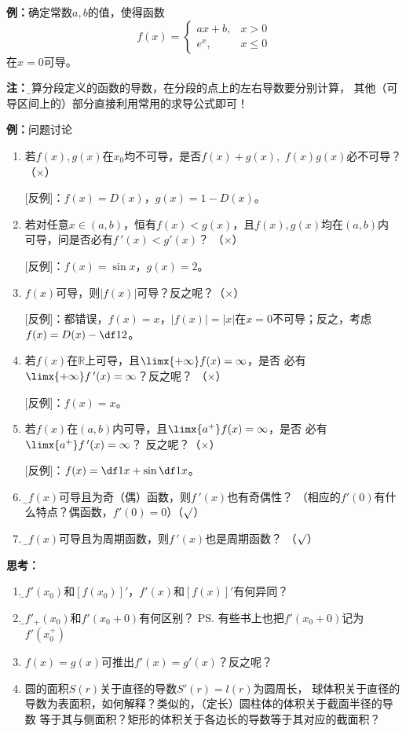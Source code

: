 {\bf 例：}确定常数$a,b$的值，使得函数
$$f(x)=\left\{\begin{array}{ll}ax+b,& x>0\\
e^x,& x\leq 0\end{array}\right.$$
在$x=0$可导。

{\bf 注：}{\b 计算分段定义的函数的导数，在分段的点上的左右导数要分别计算，
其他（可导区间上的）部分直接利用常用的求导公式即可！}

{\bf 例：}问题讨论
\begin{enumerate}[(1)]
  \setlength{\itemindent}{1cm}
  \item 若$f(x),g(x)$在$x_0$均不可导，是否$f(x)+g(x),$ $f(x)g(x)$必不可导？
  （{$\times$}） 
  
  [反例]：$f(x)=D(x)$，$g(x)=1-D(x)$。
  \item 若对任意$x\in (a,b)$，恒有$f(x)<g(x)$，且$f(x),g(x)$均在$(a,b)$内
  可导，问是否必有$f\,'(x)<g'(x)$？ （{$\times$}）
  
  [反例]：$f(x)=\sin x$，$g(x)=2$。 
  \item $f(x)$可导，则$|f(x)|$可导？反之呢？（{$\times$}）
  
  [反例]：都错误，$f(x)=x$，$|f(x)|=|x|$在$x=0$不可导；反之，考虑$f(x)=D(x)-\df12$。
  \item 若$f(x)$在$\mathbb{R}$上可导，且$\limx{+\infty}f(x)=\infty$，是否
  必有$\limx{+\infty}f\,'(x)=\infty$？反之呢？ （{$\times$}）
  
  [反例]：$f(x)=x$。
  \item 若$f(x)$在$(a,b)$内可导，且$\limx{a^+}f(x)=\infty$，是否
  必有$\limx{a^+}f\,'(x)=\infty$？ 反之呢？（{$\times$}）
  
  [反例]：$f(x)=\df1x+\sin\df1x$。 
  \item {\b 若$f(x)$可导且为奇（偶）函数，则$f\,'(x)$也有奇偶性？ 
  （相应的$f'(0)$有什么特点？偶函数，$f'(0)=0$）（{$\surd$}）} 
  \item {\b 若$f(x)$可导且为周期函数，则$f\,'(x)$也是周期函数？ （{$\surd$}）}
\end{enumerate}

% 

{\bf 思考：}
\begin{enumerate} 
  \setlength{\itemindent}{1cm}
  \item {\b $f'(x_0)$和$[f(x_0)]'$，$f'(x)$和$[f(x)]'$有何异同？}
  \item {\b $f'_+(x_0)$和$f'(x_0+0)$有何区别？}
  \ps{有些书上也把$f'(x_0+0)$记为$f'(x_0^+)$}
  \item $f(x)=g(x)$可推出$f'(x)=g'(x)$？反之呢？
  \item 圆的面积$S(r)$关于直径的导数$S'(r)=l(r)$为圆周长，
  球体积关于直径的导数为表面积，如何解释？类似的，（定长）圆柱体的体积关于截面半径的导数
  等于其与侧面积？矩形的体积关于各边长的导数等于其对应的截面积？
\end{enumerate}

